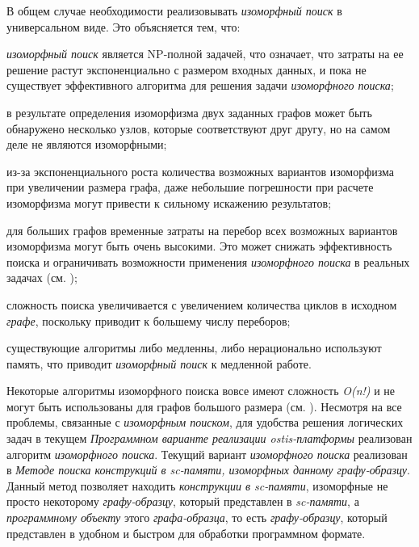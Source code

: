 В общем случае  необходимости реализовывать \textit{изоморфный поиск} в универсальном виде. Это объясняется тем, что:
\begin{textitemize}
	\item \textit{изоморфный поиск} является NP-полной задачей, что означает, что затраты на ее решение растут экспоненциально с размером входных данных, и пока не существует эффективного алгоритма для решения задачи \textit{изоморфного поиска};
	\item в результате определения изоморфизма двух заданных графов может быть обнаружено несколько узлов, которые соответствуют друг другу, но на самом деле не являются изоморфными;
	\item из-за экспоненциального роста количества возможных вариантов изоморфизма при увеличении размера графа, даже небольшие погрешности при расчете изоморфизма могут привести к сильному искажению результатов;
	\item для больших графов временные затраты на перебор всех возможных вариантов изоморфизма могут быть очень высокими. Это может снижать эффективность поиска и ограничивать возможности применения \textit{изоморфного поиска} в реальных задачах (см. );
	\item сложность поиска увеличивается с увеличением количества циклов в исходном \textit{графе}, поскольку приводит к большему числу переборов;
	\item существующие алгоритмы либо медленны, либо нерационально используют память, что приводит \textit{изоморфный поиск} к медленной работе.
\end{textitemize}

Некоторые алгоритмы изоморфного поиска вовсе имеют сложность \textit{O(n!)} и не могут быть использованы для графов большого размера (см. ). Несмотря на все проблемы, связанные с \textit{изоморфным поиском}, для удобства решения логических задач в текущем \textit{Программном варианте реализации ostis-платформы} реализован  алгоритм \textit{изоморфного поиска}. Текущий вариант \textit{изоморфного поиска} реализован в \textit{Методе поиска конструкций в sc-памяти, изоморфных данному графу-образцу}. Данный метод позволяет находить \textit{конструкции в sc-памяти}, изоморфные не просто некоторому \textit{графу-образцу}, который представлен в \textit{sc-памяти}, а \textit{программному объекту} этого \textit{графа-образца}, то есть \textit{графу-образцу}, который представлен в удобном и быстром для обработки программном формате.

